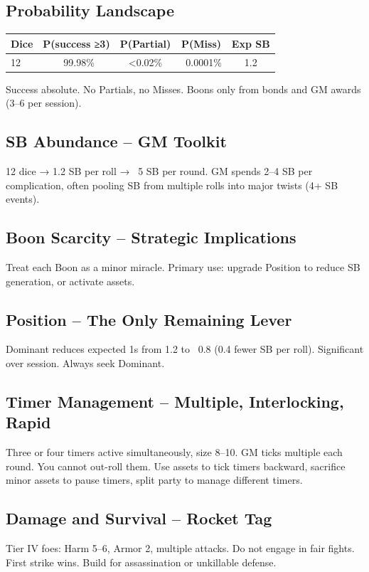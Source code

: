\documentclass[11pt]{article}
\begin{document}
\subsection{Probability Landscape}
\begin{table}[h]
\centering
\begin{tabular}{lcccc}
\toprule
\textbf{Dice} & \textbf{P(success ≥3)} & \textbf{P(Partial)} & \textbf{P(Miss)} & \textbf{Exp SB} \\
\midrule
12 & ~99.98\% & <0.02\% & ~0.0001\% & 1.2 \\
\bottomrule
\end{tabular}
\end{table}
Success absolute. No Partials, no Misses. Boons only from bonds and GM awards (3–6 per session).

\subsection{SB Abundance – GM Toolkit}
12 dice → 1.2 SB per roll → ~5 SB per round. GM spends 2–4 SB per complication, often pooling SB from multiple rolls into major twists (4+ SB events).

\subsection{Boon Scarcity – Strategic Implications}
Treat each Boon as a minor miracle. Primary use: upgrade Position to reduce SB generation, or activate assets.

\subsection{Position – The Only Remaining Lever}
Dominant reduces expected 1s from 1.2 to ~0.8 (0.4 fewer SB per roll). Significant over session. Always seek Dominant.

\subsection{Timer Management – Multiple, Interlocking, Rapid}
Three or four timers active simultaneously, size 8–10. GM ticks multiple each round. You cannot out-roll them. Use assets to tick timers backward, sacrifice minor assets to pause timers, split party to manage different timers.

\subsection{Damage and Survival – Rocket Tag}
Tier IV foes: Harm 5–6, Armor 2, multiple attacks. Do not engage in fair fights. First strike wins. Build for assassination or unkillable defense.
\end{document}
